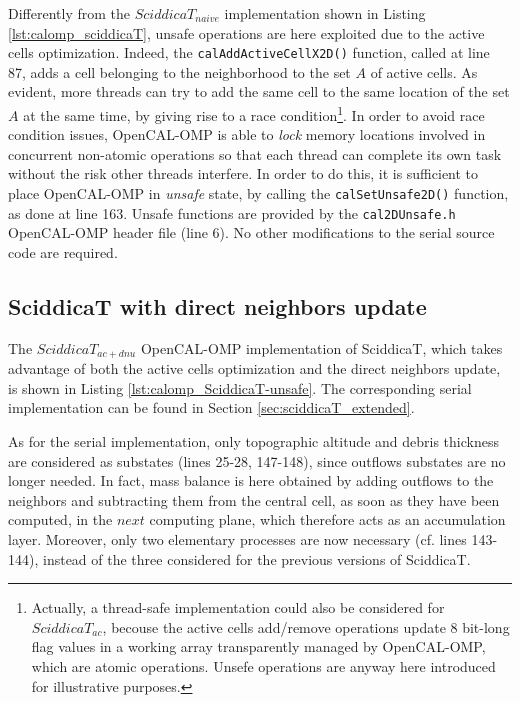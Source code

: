 Differently from the $SciddicaT_{naive}$ implementation shown in
Listing \ref{lst:calomp_sciddicaT}, unsafe operations are here
exploited due to the active cells optimization. Indeed, the
\verb'calAddActiveCellX2D()' function, called at line 87, adds a cell
belonging to the neighborhood to the set $A$ of active cells. As
evident, more threads can try to add the same cell to the same
location of the set $A$ at the same time, by giving rise to a race
condition\footnote{Actually, a thread-safe implementation could also
  be considered for $SciddicaT_{ac}$, becouse the active cells
  add/remove operations update 8 bit-long flag values in a working
  array transparently managed by OpenCAL-OMP, which are atomic
  operations. Unsefe operations are anyway here introduced for
  illustrative purposes.}. In order to avoid race condition issues,
OpenCAL-OMP is able to \emph{lock} memory locations involved in
concurrent non-atomic operations so that each thread can complete its
own task without the risk other threads interfere. In order to do
this, it is sufficient to place OpenCAL-OMP in \emph{unsafe} state, by
calling the \verb'calSetUnsafe2D()' function, as done at line
163. Unsafe functions are provided by the \verb'cal2DUnsafe.h'
OpenCAL-OMP header file (line 6). No other modifications to the serial
source code are required.

\subsection{SciddicaT with direct neighbors update}
The $SciddicaT_{ac+dnu}$ OpenCAL-OMP implementation of SciddicaT,
which takes advantage of both the active cells optimization and the
direct neighbors update, is shown in Listing
\ref{lst:calomp_SciddicaT-unsafe}. The corresponding serial
implementation can be found in Section \ref{sec:sciddicaT_extended}.



As for the serial implementation, only topographic altitude and debris
thickness are considered as substates (lines 25-28, 147-148), since
outflows substates are no longer needed. In fact, mass balance is here
obtained by adding outflows to the neighbors and subtracting them from
the central cell, as soon as they have been computed, in the $next$
computing plane, which therefore acts as an accumulation
layer. Moreover, only two elementary processes are now necessary
(cf. lines 143-144), instead of the three considered for the previous
versions of SciddicaT.

